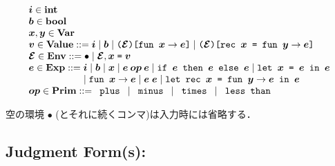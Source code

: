 \documentclass[11pt]{jarticle}
\begin{document}
\[\begin{array}{l}
\EvalMLiiiMV{i}[] \in \mathbf{int}\\
\EvalMLiiiMV{b}[] \in \mathbf{bool}\\
\EvalMLiiiMV{x}[], \EvalMLiiiMV{y}[] \in \mathbf{Var}\\
\EvalMLiiiMV{v}[] \in \mathbf{Value} ::= \EvalMLiiiMV{i}[]
\mid \EvalMLiiiMV{b}[] \mid \EvalMLiiiFunTerm{\EvalMLiiiMV{env}[]}
{\EvalMLiiiMV{x}[]}{\EvalMLiiiMV{e}[]}
\mid \EvalMLiiiRecTerm{\EvalMLiiiMV{env}[]}{\EvalMLiiiMV{x}[]}
{\EvalMLiiiMV{y}[]}{\EvalMLiiiMV{e}[]}\\
\EvalMLiiiMV{env}[] \in \mathbf{Env} ::= \EvalMLiiiEmptyTerm
\mid \EvalMLiiiBindTerm{\EvalMLiiiMV{env}[]}{\EvalMLiiiMV{x}[]}
{\EvalMLiiiMV{v}[]}\\
\EvalMLiiiMV{e}[] \in \mathbf{Exp} ::= \EvalMLiiiMV{i}[]
\mid \EvalMLiiiMV{b}[] \mid \EvalMLiiiMV{x}[]
\mid \EvalMLiiiBinOpTerm{\EvalMLiiiMV{op}[]}{\EvalMLiiiMV{e}[]}
{\EvalMLiiiMV{e}[]} \mid \EvalMLiiiIfTerm{\EvalMLiiiMV{e}[]}
{\EvalMLiiiMV{e}[]}{\EvalMLiiiMV{e}[]}
\mid \EvalMLiiiLetTerm{\EvalMLiiiMV{x}[]}{\EvalMLiiiMV{e}[]}
{\EvalMLiiiMV{e}[]} \\ \hspace*{2.0cm}
\mid \EvalMLiiiAbsTerm{\EvalMLiiiMV{x}[]}
{\EvalMLiiiMV{e}[]} \mid \EvalMLiiiAppTerm{\EvalMLiiiMV{e}[]}
{\EvalMLiiiMV{e}[]} \mid \EvalMLiiiLetRecTerm{\EvalMLiiiMV{x}[]}
{\EvalMLiiiMV{y}[]}{\EvalMLiiiMV{e}[]}{\EvalMLiiiMV{e}[]}\\
\EvalMLiiiMV{op}[] \in \mathbf{Prim} ::= \EvalMLiiiPlusTerm
\mid \EvalMLiiiMinusTerm \mid \EvalMLiiiMultTerm
\mid \EvalMLiiiLtTerm\\
\end{array}\]

空の環境 \(\bullet\) (とそれに続くコンマ)は入力時には省略する．

\subsection*{Judgment Form(s):}

\end{document}
